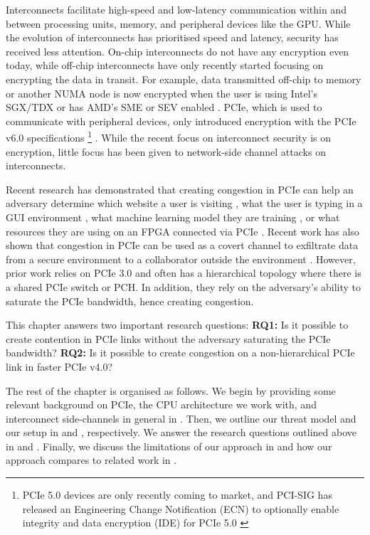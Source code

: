 
Interconnects facilitate high-speed and low-latency communication within and between processing units, memory, and peripheral devices like the GPU.
While the evolution of interconnects has prioritised speed and latency, security has received less attention.
On-chip interconnects do not have any encryption even today, while off-chip interconnects have only recently started focusing on encrypting the data in transit.
For example, data transmitted off-chip to memory or another NUMA node is now encrypted when the user is using Intel's SGX/TDX or has AMD's SME or SEV enabled \cite{intel_upi_encryption, amd_gen_5_arch}.
PCIe, which is used to communicate with peripheral devices, only introduced encryption with the PCIe v6.0 specifications 
\footnote{PCIe 5.0 devices are only recently coming to market, and PCI-SIG has released an Engineering Change Notification (ECN) to optionally enable integrity and data encryption (IDE) for PCIe 5.0 \cite{pcie_ide_v5_ecn}}
\cite{pcie_ide_v6}.
While the recent focus on interconnect security is on encryption, little focus has been given to network-side channel attacks on interconnects.

Recent research has demonstrated that creating congestion in PCIe can help an adversary determine which website a user is visiting \cite{tan2021invisible, side2022lockeddown}, what the user is typing in a GUI environment \cite{tan2021invisible}, what machine learning model they are training \cite{tan2021invisible}, or what resources they are using on an FPGA connected via PCIe \cite{giechaskiel2022cross}.
Recent work has also shown that congestion in PCIe can be used as a covert channel to exfiltrate data from a secure environment to a collaborator outside the environment \cite{giechaskiel2022cross, khaliq2021timing}.
However, prior work relies on PCIe 3.0 and often has a hierarchical topology where there is a shared PCIe switch or PCH.
In addition, they rely on the adversary's ability to saturate the PCIe bandwidth, hence creating congestion.

This chapter answers two important research questions:
\textbf{RQ1:} Is it possible to create contention in PCIe links without the adversary saturating the PCIe bandwidth?
\textbf{RQ2:} Is it possible to create congestion on a non-hierarchical PCIe link in faster PCIe v4.0?

The rest of the chapter is organised as follows.
We begin by providing some relevant background on PCIe, the CPU architecture we work with, and interconnect side-channels in general in . 
Then, we outline our threat model and our setup in  and , respectively.
We answer the research questions outlined above in  and .
Finally, we discuss the limitations of our approach in  and how our approach compares to related work in .
